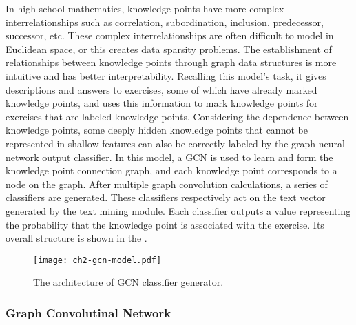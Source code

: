 
In high school mathematics, knowledge points have more complex interrelationships such as correlation, subordination, inclusion, predecessor, successor, etc. These complex interrelationships are often difficult to model in Euclidean space, or this creates data sparsity problems. The establishment of relationships between knowledge points through graph data structures is more intuitive and has better interpretability. Recalling this model's task, it gives descriptions and answers to exercises, some of which have already marked knowledge points, and uses this information to mark knowledge points for exercises that are labeled knowledge points. Considering the dependence between knowledge points, some deeply hidden knowledge points that cannot be represented in shallow features can also be correctly labeled by the graph neural network output classifier. In this model, a GCN is used to learn and form the knowledge point connection graph, and each knowledge point corresponds to a node on the graph. After multiple graph convolution calculations, a series of classifiers are generated. These classifiers respectively act on the text vector generated by the text mining module. Each classifier outputs a value representing the probability that the knowledge point is associated with the exercise. Its overall structure is shown in the \figname{\ref{fig:ch2-gcn-ov}}.

\begin{figure}[htbp!]
    \centering
    \texttt{[image: ch2-gcn-model.pdf]}
    \caption{The architecture of GCN classifier generator.}\label{fig:ch2-gcn-ov}
\end{figure}



\subsubsection{Graph Convolutinal Network}

